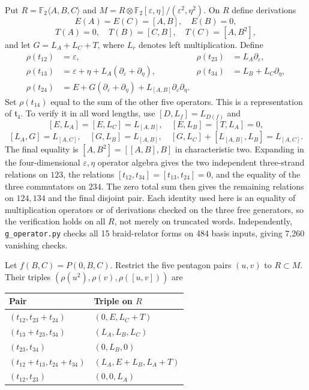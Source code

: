 \documentclass[10pt,a4paper]{article}
\begin{document}
Put \(R=\mathbb F_2\langle A,B,C\rangle\) and \(M=R\otimes\mathbb F_2[\varepsilon,\eta]/(\varepsilon^2,\eta^2)\). On \(R\) define derivations \[
E(A)=E(C)=[A,B],\quad E(B)=0,
\] \[
T(A)=0,\quad T(B)=[C,B],\quad T(C)=[A,B^2],
\] and let \(G=L_A+L_C+T\), where \(L_r\) denotes left multiplication. Define \[
\begin{aligned}
\rho(t_{12})&=\varepsilon,&
\rho(t_{23})&=L_A\partial_\varepsilon,\\
\rho(t_{13})&=\varepsilon+\eta+L_A(\partial_\varepsilon+\partial_\eta),&
\rho(t_{34})&=L_B+L_C\partial_\eta,\\
\rho(t_{24})&=E+G(\partial_\varepsilon+\partial_\eta)
 +L_{[A,B]}\partial_\varepsilon\partial_\eta.
\end{aligned}
\] Set \(\rho(t_{14})\) equal to the sum of the other five operators. This is a representation of \(\mathfrak t_4\). To verify it in all word lengths, use \([D,L_f]=L_{D(f)}\) and \[
[E,L_A]=[E,L_C]=L_{[A,B]},\quad [E,L_B]=[T,L_A]=0,
\] \[
[L_A,G]=L_{[A,C]},\quad[G,L_B]=L_{[A,B]},\quad
[G,L_C]+[L_{[A,B]},L_B]=L_{[A,C]}.
\] The final equality is \([A,B^2]=[[A,B],B]\) in characteristic two. Expanding in the four-dimensional \(\varepsilon,\eta\) operator algebra gives the two independent three-strand relations on \(123\), the relations \([t_{12},t_{34}]=[t_{13},t_{24}]=0\), and the equality of the three commutators on \(234\). The zero total sum then gives the remaining relations on \(124,134\) and the final disjoint pair. Each identity used here is an equality of multiplication operators or of derivations checked on the three free generators, so the verification holds on all \(R\), not merely on truncated words. Independently, \texttt{g\_operator.py} checks all 15 braid-relator forms on 484 basis inputs, giving 7,260 vanishing checks.

Let \(f(B,C)=P(0,B,C)\). Restrict the five pentagon pairs \((u,v)\) to \(R\subset M\). Their triples \((\rho(u^2),\rho(v),\rho([u,v]))\) are

\begin{longtable}[]{@{}ll@{}}
\toprule\noalign{}
Pair & Triple on \(R\) \\
\midrule\noalign{}
\endhead
\bottomrule\noalign{}
\endlastfoot
\((t_{12},t_{23}+t_{24})\) & \((0,E,L_C+T)\) \\
\((t_{13}+t_{23},t_{34})\) & \((L_A,L_B,L_C)\) \\
\((t_{23},t_{34})\) & \((0,L_B,0)\) \\
\((t_{12}+t_{13},t_{24}+t_{34})\) & \((L_A,E+L_B,L_A+T)\) \\
\((t_{12},t_{23})\) & \((0,0,L_A)\) \\
\end{longtable}
\end{document}

